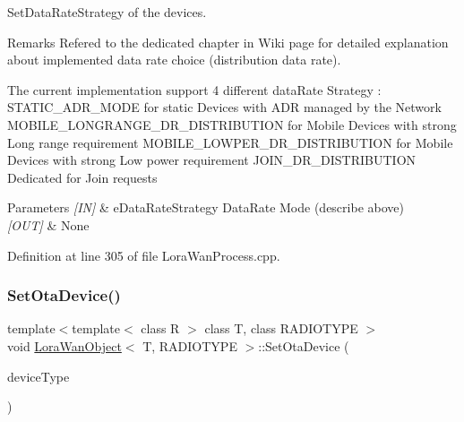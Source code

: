 Set\+Data\+Rate\+Strategy of the devices. 

\begin{DoxyRemark}{Remarks}
Refered to the dedicated chapter in Wiki page for detailed explanation about implemented data rate choice (distribution data rate). 

The current implementation support 4 different data\+Rate Strategy \+: S\+T\+A\+T\+I\+C\+\_\+\+A\+D\+R\+\_\+\+M\+O\+DE for static Devices with A\+DR managed by the Network M\+O\+B\+I\+L\+E\+\_\+\+L\+O\+N\+G\+R\+A\+N\+G\+E\+\_\+\+D\+R\+\_\+\+D\+I\+S\+T\+R\+I\+B\+U\+T\+I\+ON for Mobile Devices with strong Long range requirement M\+O\+B\+I\+L\+E\+\_\+\+L\+O\+W\+P\+E\+R\+\_\+\+D\+R\+\_\+\+D\+I\+S\+T\+R\+I\+B\+U\+T\+I\+ON for Mobile Devices with strong Low power requirement J\+O\+I\+N\+\_\+\+D\+R\+\_\+\+D\+I\+S\+T\+R\+I\+B\+U\+T\+I\+ON Dedicated for Join requests
\end{DoxyRemark}

\begin{DoxyParams}{Parameters}
{\em \mbox{[}\+I\+N\mbox{]}} & e\+Data\+Rate\+Strategy Data\+Rate Mode (describe above) \\
\hline
{\em \mbox{[}\+O\+U\+T\mbox{]}} & None \\
\hline
\end{DoxyParams}


Definition at line 305 of file Lora\+Wan\+Process.\+cpp.

\mbox{\label{class_lora_wan_object_a0a8c97531cab1e5610e54f9c1c416185}} 
\subsubsection{\texorpdfstring{Set\+Ota\+Device()}{SetOtaDevice()}}
{\footnotesize\ttfamily template$<$template$<$ class R $>$ class T, class R\+A\+D\+I\+O\+T\+Y\+PE $>$ \\
void \mbox{\hyperlink{class_lora_wan_object}{Lora\+Wan\+Object}}$<$ T, R\+A\+D\+I\+O\+T\+Y\+PE $>$\+::Set\+Ota\+Device (\begin{DoxyParamCaption}\item[{\mbox{\hyperlink{_define_8h_a1e0a07faefc3dd68bbdd06f7c856cc74}{e\+Device\+Type\+O\+T\+A\+\_\+\+A\+PB}}}]{device\+Type }\end{DoxyParamCaption})}



